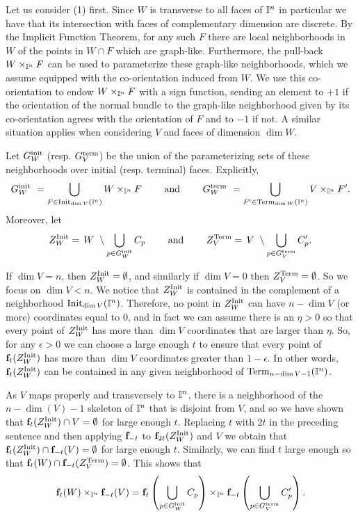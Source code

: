 Let us consider (1) first.
Since $W$ is transverse to all faces of $\mathbb{I}^n$ in particular we have that its intersection with faces of complementary dimension are discrete.
By the Implicit Function Theorem, for any such $F$ there are local neighborhoods in $W$ of the points in $W \cap F$ which are graph-like.
Furthermore, the pull-back $W \times_{\mathbb{I}^n} F$ can be used to parameterize these graph-like neighborhoods, which we assume equipped with the co-orientation induced from $W$.
We use this co-orientation to endow $W \times_{\mathbb{I}^n} F$ with a sign function,
sending an element to $+1$ if the orientation of the normal bundle to the graph-like neighborhood given by its co-orientation agrees
with the orientation of $F$ and to $-1$ if not.
A similar situation applies when considering $V$ and faces of dimension $\dim W$.

Let $G^{\mathrm{init}}_W$ (resp. $G^{\mathrm{term}}_V$) be the union of the parameterizing sets of these neighborhoods over initial (resp. terminal) faces.
Explicitly,
\begin{equation*}
	G^{\mathrm{init}}_W\ =
	\bigcup_{F \in {\rm Init}_{\dim V}(\mathbb{I}^n)} W \times_{\mathbb{I}^n} F
	\qquad \text{ and } \qquad
	G^{\mathrm{term}}_W\ =
	\bigcup_{F^\prime \in {\rm Term}_{\dim W}(\mathbb{I}^n)} V \times_{\mathbb{I}^n} F^\prime.
\end{equation*}
Moreover, let
\begin{equation*}
	Z_W^{\rm Init} =\, W\ \setminus \bigcup_{p \in G^{\mathrm{init}}_W} C_p
	\qquad \text{ and } \qquad
	Z_V^{\rm Term} =\, V\ \setminus \bigcup_{p \in G^{\mathrm{term}}_V} C_p^\prime.
\end{equation*}

If $\dim V=n$, then $Z_W^{\rm Init}=\emptyset$, and similarly if $\dim V=0$ then $Z_V^{\rm Term}=\emptyset$.
So we focus on $\dim V<n$.
We notice that $Z_W^{\rm Init}$ is contained in the complement of a neighborhood ${\rm Init}_{\dim V}(\mathbb{I}^n)$.
Therefore, no point in $Z_W^{\rm Init}$ can have $n-\dim V$ (or more) coordinates equal to $0$, and in fact we can assume there is an $\eta>0$
so that every point of $Z_W^{\rm Init}$ has more than $\dim V$ coordinates that are larger than $\eta$.
So, for any $\epsilon>0$ we can choose a large enough $t$ to ensure that every point of $\mathbf{f}_t(Z_W^{\rm Init})$ has more than $\dim V$ coordinates greater than
$1-\epsilon$.
In other words, $\mathbf{f}_t(Z_W^{\rm Init})$ can be contained in any given neighborhood of ${\rm Term}_{n-\dim V-1}(\mathbb{I}^n)$.

As $V$ maps properly and transversely to $\mathbb{I}^n$, there is a neighborhood of the $n-\dim(V)-1$ skeleton of $\mathbb{I}^n$ that is disjoint from $V$, and so we have shown that $\mathbf{f}_t(Z_W^{\rm Init}) \cap V = \emptyset$ for large enough $t$.
Replacing $t$ with $2t$ in the preceding sentence and then applying $\mathbf{f}_{-t}$ to $\mathbf{f}_{2t}(Z_W^{\rm Init})$ and $V$ we obtain that $\mathbf{f}_t(Z_W^{\rm Init}) \cap \mathbf{f}_{-t}(V) = \emptyset$ for large enough $t$.
Similarly, we can find $t$ large enough so that $\mathbf{f}_{t}(W) \cap \mathbf{f}_{-t}(Z_V^{\rm Term}) = \emptyset$.
This shows that
\begin{equation}\label{E:reduction to C}
	\mathbf{f}_t(W) \times_{\mathbb{I}^n} \mathbf{f}_{-t}(V) = \mathbf{f}_t \left( \bigcup_{p \in G^{\mathrm{init}}_W} C_p \right) \times_{\mathbb{I}^n} \mathbf{f}_{-t} \left( \bigcup_{p \in G^{\mathrm{term}}_V} C_p^\prime \right).
\end{equation}

